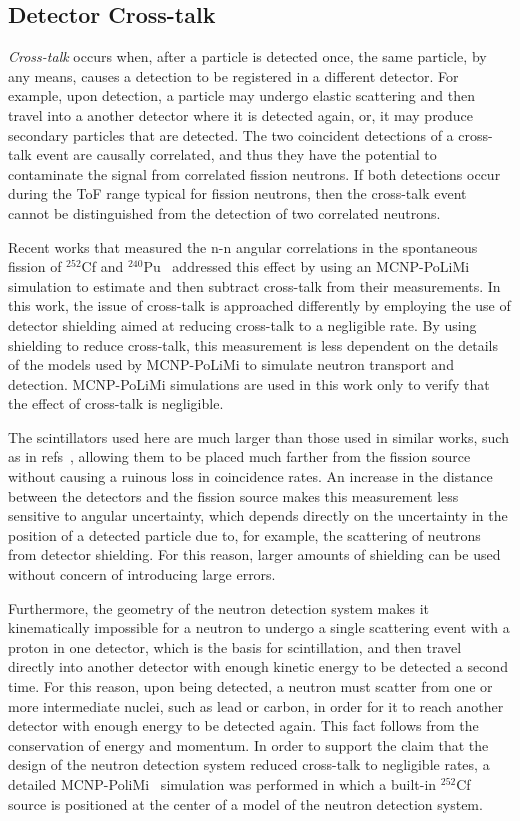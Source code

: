 \documentclass[%
 reprint,
 amsmath,amssymb,
 aps,
 nofootinbib
]{revtex4-1}
\begin{document}
\subsection{Detector Cross-talk}
\label{crosstalk}
\textit{Cross-talk} occurs when, after a particle is detected once, the same particle, by any means, causes a detection to be registered in a different detector.
For example, upon detection, a particle may undergo elastic scattering and then travel into a another detector where it is detected again, or, it may produce secondary particles that are detected.
The two coincident detections of a cross-talk event are causally correlated, and thus they have the potential to contaminate the signal from correlated fission neutrons.
If both detections occur during the ToF range typical for fission neutrons, then the cross-talk event cannot be distinguished from the detection of two correlated neutrons.

Recent works that measured the n-n angular correlations in the spontaneous fission of $^{252}$Cf and $^{240}$Pu~\cite{Pozzi2016,Verbeke2018} addressed this effect by using an MCNP-PoLiMi simulation to estimate and then subtract cross-talk from their measurements.
In this work, the issue of cross-talk is approached differently by employing the use of detector shielding aimed at reducing cross-talk to a negligible rate.
By using shielding to reduce cross-talk, this measurement is less dependent on the details of the models used by MCNP-PoLiMi to simulate neutron transport and detection.
MCNP-PoLiMi simulations are used in this work only to verify that the effect of cross-talk is negligible.

The scintillators used here are much larger than those used in similar works, such as in refs~\cite{Pozzi2016,Verbeke2018}, allowing them to be placed much farther from the fission source without causing a ruinous loss in coincidence rates. 
An increase in the distance between the detectors and the fission source makes this measurement less sensitive to angular uncertainty, which depends directly on the uncertainty in the position of a detected particle due to, for example, the scattering of neutrons from detector shielding.
For this reason, larger amounts of shielding can be used without concern of introducing large errors.
 
Furthermore, the geometry of the neutron detection system makes it kinematically impossible for a neutron to undergo a single scattering event with a proton in one detector, which is the basis for scintillation, and then travel directly into another detector with enough kinetic energy to be detected a second time.
For this reason, upon being detected, a neutron must scatter from one or more intermediate nuclei, such as lead or carbon, in order for it to reach another detector with enough energy to be detected again.
This fact follows from the conservation of energy and momentum.
In order to support the claim that the design of the neutron detection system reduced cross-talk to negligible rates, a detailed MCNP-PoliMi~\cite{MCNP_POLIMI} simulation was performed in which a built-in $^{252}$Cf source is positioned at the center of a model of the neutron detection system.
\end{document}
